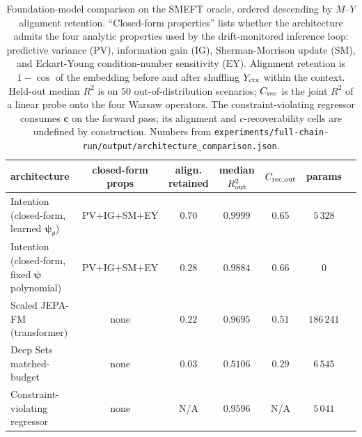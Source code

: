 \documentclass[11pt,a4paper]{article}
\newcommand{\psib}{\bm{\psi}}
\begin{document}
\begin{table}[t]
\centering\footnotesize
\setlength{\tabcolsep}{3pt}
\caption{\label{tab:arch-comparison} Foundation-model comparison on the SMEFT oracle, ordered descending by $M$--$Y$ alignment retention. ``Closed-form properties'' lists whether the architecture admits the four analytic properties used by the drift-monitored inference loop: predictive variance (PV), information gain (IG), Sherman-Morrison update (SM), and Eckart-Young condition-number sensitivity (EY). Alignment retention is $1 - \cos$ of the embedding before and after shuffling $Y_{\rm ctx}$ within the context. Held-out median $R^2$ is on $50$ out-of-distribution scenarios; $C_{\rm rec}$ is the joint $R^2$ of a linear probe onto the four Warsaw operators. The constraint-violating regressor consumes $\bm{c}$ on the forward pass; its alignment and $c$-recoverability cells are undefined by construction. Numbers from \texttt{experiments/full-chain-run/output/architecture\_comparison.json}.}
\begin{tabular}{lcccccc}
\toprule
architecture & closed-form props & align. retained & median $R^2_{\rm out}$ & $C_{\rm rec, out}$ & params \\
\midrule
Intention (closed-form, learned $\psib_\theta$) & PV+IG+SM+EY & $0.70$ & $0.9999$ & $0.65$ & $5\,328$ \\
Intention (closed-form, fixed $\psib$ polynomial) & PV+IG+SM+EY & $0.28$ & $0.9884$ & $0.66$ & $0$ \\
Scaled JEPA-FM (transformer)                      & none        & $0.22$ & $0.9695$ & $0.51$ & $186\,241$ \\
Deep Sets matched-budget                          & none        & $0.03$ & $0.5106$ & $0.29$ & $6\,545$ \\
Constraint-violating regressor                    & none        & N/A    & $0.9596$ & N/A    & $5\,041$ \\
\bottomrule
\end{tabular}
\end{table}
\end{document}
